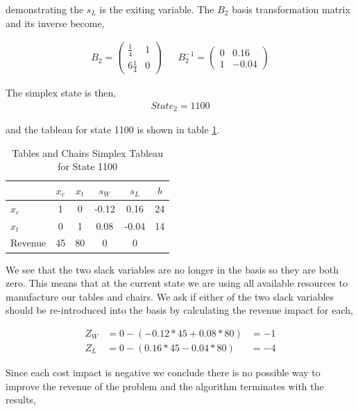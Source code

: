 demonstrating the $s_L$ is the exiting variable. The $B_2$ basis
transformation matrix and its inverse become,

\begin{align*}
B_2 = \begin{pmatrix}\frac{1}{4}&1\\6\frac{1}{4}&0\end{pmatrix} && B_2^{-1} = \begin{pmatrix}0&0.16\\1&-0.04\end{pmatrix}
\end{align*}

The simplex state is then,
\begin{align*}
State_2 = 1100
\end{align*}

and the tableau for state 1100 is shown in table \ref{tab:tc1100}.

\begin{table}
\centering
\begin{tabular}{| l | c c c c | c |}
\hline
        & $x_c$ & $x_t$ & $s_W$ & $s_L$ & $b$\\
\hline
$x_c$   & 1    & 0    & -0.12   & 0.16     & 24\\
$x_t$   & 0    & 1    & 0.08    & -0.04    & 14\\
\hline
Revenue & 45    & 80    & 0     & 0     &\\
\hline
\end{tabular}
  \caption[Tables and Chairs Simplex Tableau for State 1100]
          {Tables and Chairs Simplex Tableau for State 1100}
  \label{tab:tc1100}
\end{table}

We see that the two slack variables are no longer in the basis so they
are both zero. This means that at the current state we are using all
available resources to manufacture our tables and chairs. We ask if
either of the two slack variables should be re-introduced into the
basis by calculating the revenue impact for each,

\begin{align*}
Z_W &= 0 - (-0.12*45 + 0.08*80) &= -1\\
Z_L &= 0 - (0.16*45 - 0.04*80) &= -4
\end{align*}

Since each  cost impact is negative we conclude there is no possible
way to improve the revenue of the problem and the algorithm terminates
with the results,

